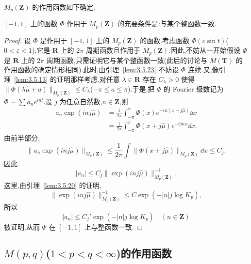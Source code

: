$M_{p}(\mathbf{Z})$ 的作用函数如下确定.

\begin{theorem}\label{thm:3.5.24}
$[-1, 1]$ 上的函数 $\Phi$ 作用于 $M_{p}(\mathbf{Z})$ 的充要条件是:与某个整函数一致.
\end{theorem}

\begin{proof}
设 $\Phi$ 是作用于 $[-1, 1]$ 上的 $M_p(\mathbf{Z})$ 的函数.考虑函数 $\Phi(\varepsilon\sin t)$($0 < \varepsilon < 1$),它是 $\mathbf{R}$ 上的 $2\pi$ 周期函数且作用于 $M_p(\mathbf{Z})$.因此,不妨从一开始假设 $\Phi$ 是 $\mathbf{R}$ 上的 $2\pi$ 周期函数,只需证明它与某个整函数一致(此后的讨论与 $M(\mathbf{T})$ 的作用函数的确定情形相同).此时,由引理~\ref{lem:3.5.23} 不妨设 $\Phi$ 连续.又,像引理~\ref{lem:3.5.13} 的证明那样考虑,对任意 $\lambda \in \mathbf{R}$ 存在 $C_\lambda > 0$ 使得 $\|\Phi(\lambda\hat{\mu} + a)\|_{M_p(\mathbf{Z})} \leq C_\lambda$($-\pi \leq a \leq \pi$).于是,把 $\Phi$ 的 Fourier 级数记为 $\Phi \sim \sum a_n e^{int}$.设 $j$ 为任意自然数,$n \in \mathbf{Z}$,则
\begin{align*}
a_{n}\exp(inj\widehat{\mu}) &= \frac{1}{2\pi}\int_{-\pi}^{\pi}\Phi(x)e^{-in(x-j\widehat{\mu})}\dd x\\
&= \frac{1}{2\pi}\int_{-\pi}^{\pi}\Phi(x + j\widehat{\mu})e^{-ijnx}\dd x.
\end{align*}
由前半部分,
\begin{equation*}
\|a_{n}\exp(inj\widehat{\mu})\|_{M_{p}(\mathbf{Z})} \leq \frac{1}{2\pi}\int\|\Phi(x + j\widehat{\mu})\|_{M_{p}(\mathbf{Z})}\dd x \leq C_{j}.
\end{equation*}
因此
\begin{equation*}
|a_{n}| \leq C_{j}\|\exp(inj\widehat{\mu})\|_{M_{p}(\mathbf{Z})}^{-1}.
\end{equation*}
这里,由引理~\ref{lem:3.5.20} 的证明,
\begin{equation*}
\|\exp(inj\widehat{\mu})\|_{M_{p}(\mathbf{Z})}^{-1} \leq C\exp(-|n|j\log K_{p}),
\end{equation*}
所以
\begin{equation*}
|a_{n}| \leq C_{j}'\exp(-|n|j\log K_{p}) \quad (n \in \mathbf{Z})
\end{equation*}
被证明.从而 $\Phi$ 在 $[-1, 1]$ 上与整函数一致.
\end{proof}

\subsection{\texorpdfstring{$M(p,q)$($1<p<q<\infty$)的作用函数}{M(p,q)(1<p<q<∞)的作用函数}}\label{sec:3.5.5}


